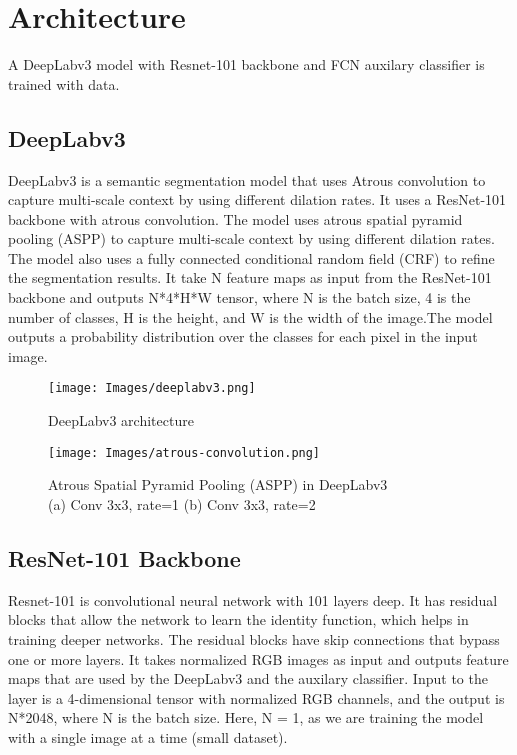 \section{Architecture}

A DeepLabv3 model with Resnet-101 backbone and FCN auxilary classifier is trained with data. 

\subsection{DeepLabv3}

DeepLabv3 is a semantic segmentation model that uses Atrous convolution to capture multi-scale context by using different dilation rates. It uses a ResNet-101 backbone with atrous convolution. The model uses atrous spatial pyramid pooling (ASPP) to capture multi-scale context by using different dilation rates. The model also uses a fully connected conditional random field (CRF) to refine the segmentation results. 
It take N feature maps as input from the ResNet-101 backbone and outputs N*4*H*W tensor, where N is the batch size, 4 is the number of classes, H is the height, and W is the width of the image.The model outputs a probability distribution over the classes for each pixel in the input image.  
\begin{figure}[h]
    \centering
    \texttt{[image: Images/deeplabv3.png]}
    \caption{DeepLabv3 architecture~\cite{deeplabv3-image}}
    \label{fig:deeplabv3}
\end{figure}

\begin{figure}[h]
    \centering
    \texttt{[image: Images/atrous-convolution.png]}
    \caption{Atrous Spatial Pyramid Pooling (ASPP) in DeepLabv3\\ (a) Conv 3x3, rate=1 (b) Conv 3x3, rate=2 \\
    \cite{atrous-convolution-image}}
    \label{fig:atrous-convolution}
\end{figure}


\subsection{ResNet-101 Backbone}

Resnet-101 is convolutional neural network with 101 layers deep. It has residual blocks that allow the network to learn the identity function, which helps in training deeper networks. The residual blocks have skip connections that bypass one or more layers. It takes normalized RGB images as input and outputs feature maps that are used by the DeepLabv3 and the auxilary classifier. 
Input to the layer is a 4-dimensional tensor with normalized RGB channels, and the output is N*2048, where N is the batch size.  
Here, N = 1, as we are training the model with a single image at a time (small dataset).

